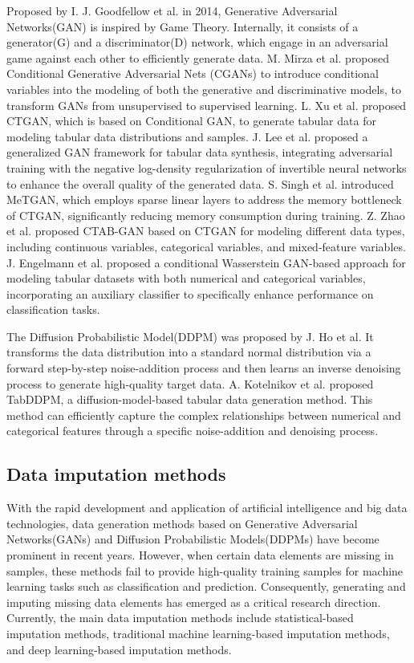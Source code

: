 \documentclass[final,1p,times]{elsarticle}
\begin{document}
Proposed by I. J. Goodfellow et al.\cite{7} in 2014, Generative Adversarial Networks(GAN) is inspired by Game Theory. Internally, it consists of a generator(G) and a discriminator(D) network, which engage in an adversarial game against each other to efficiently generate data. M. Mirza et al.\cite{12}  proposed Conditional Generative Adversarial Nets (CGANs) to introduce conditional variables into the modeling of both the generative and discriminative models, to transform GANs from unsupervised to supervised learning. L. Xu et al.\cite{11} proposed CTGAN, which is based on Conditional GAN, to generate tabular data for modeling tabular data distributions and samples. J. Lee et al.\cite{13} proposed a generalized GAN framework for tabular data synthesis, integrating adversarial training with the negative log-density regularization of invertible neural networks to enhance the overall quality of the generated data. S. Singh et al.\cite{14} introduced MeTGAN, which employs sparse linear layers to address the memory bottleneck of CTGAN, significantly reducing memory consumption during training. Z. Zhao et al.\cite{15} proposed CTAB-GAN based on CTGAN for modeling different data types, including continuous variables, categorical variables, and mixed-feature variables. J. Engelmann et al.\cite{16} proposed a conditional Wasserstein GAN-based approach for modeling tabular datasets with both numerical and categorical variables, incorporating an auxiliary classifier to specifically enhance performance on classification tasks.

The Diffusion Probabilistic Model(DDPM)\cite{9} was proposed by J. Ho et al. It transforms the data distribution into a standard normal distribution via a forward step-by-step noise-addition process and then learns an inverse denoising process to generate high-quality target data. A. Kotelnikov et al.\cite{17} proposed TabDDPM, a diffusion-model-based tabular data generation method. This method can efficiently capture the complex relationships between numerical and categorical features through a specific noise-addition and denoising process.

\subsection{Data imputation methods}
\label{subsec22}

With the rapid development and application of artificial intelligence and big data technologies, data generation methods based on Generative Adversarial Networks(GANs) and Diffusion Probabilistic Models(DDPMs) have become prominent in recent years. However, when certain data elements are missing in samples, these methods fail to provide high-quality training samples for machine learning tasks such as classification and prediction. Consequently, generating and imputing missing data elements has emerged as a critical research direction. Currently, the main data imputation methods include statistical-based imputation methods, traditional machine learning-based imputation methods, and deep learning-based imputation methods. 
\end{document}

